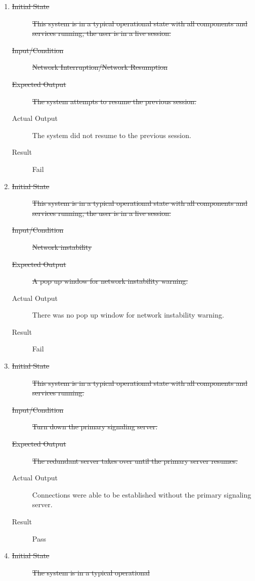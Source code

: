 \documentclass[12pt, titlepage]{article}
\begin{document}
\begin{enumerate}
\item \label{NFRT7}
  \begin{description}
  \item[\sout{Initial State}] \sout{This system is in a typical operational
      state with all components and services running, the user is in a live
      session.}
  \item[\sout{Input/Condition}] \sout{Network Interruption/Network Resumption}
  \item[\sout{Expected Output}] \sout{The system attempts to resume the
      previous session.}
  \item[Actual Output] The system did not resume to the previous session.
  \item[Result] Fail
  \end{description}
\item \label{NFRT8}
  \begin{description}
  \item[\sout{Initial State}] \sout{This system is in a typical operational
      state with all components and services running, the user is in a live
      session.}
  \item[\sout{Input/Condition}] \sout{Network instability}
  \item[\sout{Expected Output}] \sout{A pop up window for network instability
      warning.}
  \item[Actual Output] There was no pop up window for network instability
    warning.
  \item[Result] Fail
  \end{description}
\item \label{NFRT9}
  \begin{description}
  \item[\sout{Initial State}] \sout{This system is in a typical operational
      state with all components and services running.}
  \item[\sout{Input/Condition}] \sout{Turn down the primary signaling server.}
  \item[\sout{Expected Output}] \sout{The redundant server takes over until the
      primary server resumes.}
  \item[Actual Output] Connections were able to be established without the
    primary signaling server.
  \item[Result] Pass
  \end{description}
\item \label{NFRT10}
  \begin{description}
  \item[\sout{Initial State}] \sout{The system is in a typical operational
}
\end{description}
\end{enumerate}
\end{document}
